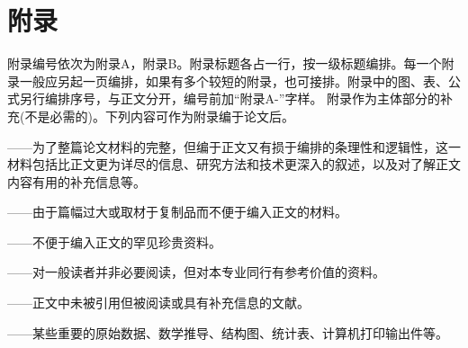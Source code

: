 \section{附录}
附录编号依次为附录A，附录B。附录标题各占一行，按一级标题编排。每一个附录一般应另起一页编排，如果有多个较短的附录，也可接排。附录中的图、表、公式另行编排序号，与正文分开，编号前加“附录A-”字样。
附录作为主体部分的补充(不是必需的)。下列内容可作为附录编于论文后。

——为了整篇论文材料的完整，但编于正文又有损于编排的条理性和逻辑性，这一材料包括比正文更为详尽的信息、研究方法和技术更深入的叙述，以及对了解正文内容有用的补充信息等。

——由于篇幅过大或取材于复制品而不便于编入正文的材料。

——不便于编入正文的罕见珍贵资料。

——对一般读者并非必要阅读，但对本专业同行有参考价值的资料。

——正文中未被引用但被阅读或具有补充信息的文献。

——某些重要的原始数据、数学推导、结构图、统计表、计算机打印输出件等。
